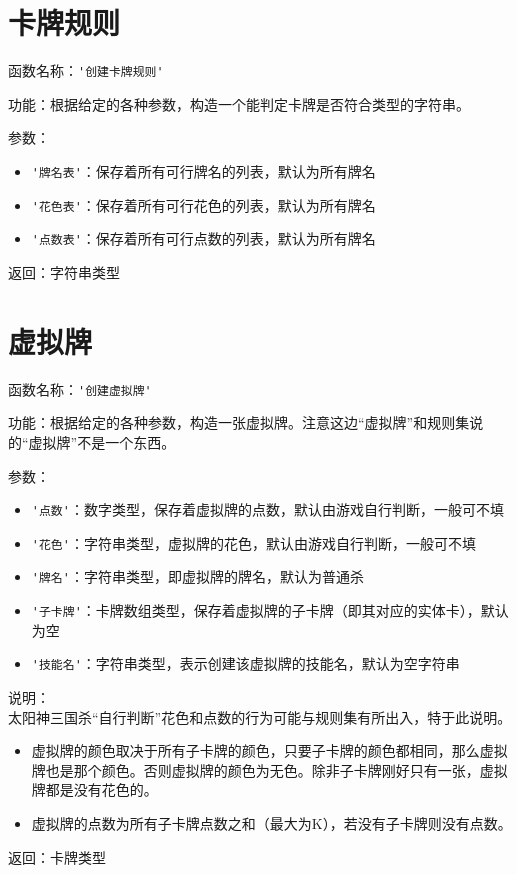 \section{卡牌规则}

函数名称：\verb|'创建卡牌规则'|

功能：根据给定的各种参数，构造一个能判定卡牌是否符合类型的字符串。

参数：

\begin{itemize}
  \item \verb|'牌名表'|：保存着所有可行牌名的列表，默认为所有牌名
  \item \verb|'花色表'|：保存着所有可行花色的列表，默认为所有牌名
  \item \verb|'点数表'|：保存着所有可行点数的列表，默认为所有牌名
\end{itemize}

返回：字符串类型

\section{虚拟牌}

函数名称：\verb|'创建虚拟牌'|

功能：根据给定的各种参数，构造一张虚拟牌。注意这边“虚拟牌”和规则集说的“虚拟牌”不是一个东西。

参数：

\begin{itemize}
  \item \verb|'点数'|：数字类型，保存着虚拟牌的点数，默认由游戏自行判断，一般可不填
  \item \verb|'花色'|：字符串类型，虚拟牌的花色，默认由游戏自行判断，一般可不填
  \item \verb|'牌名'|：字符串类型，即虚拟牌的牌名，默认为普通杀
  \item \verb|'子卡牌'|：卡牌数组类型，保存着虚拟牌的子卡牌（即其对应的实体卡），默认为空
  \item \verb|'技能名'|：字符串类型，表示创建该虚拟牌的技能名，默认为空字符串
\end{itemize}

说明：\\

太阳神三国杀“自行判断”花色和点数的行为可能与规则集有所出入，特于此说明。

\begin{itemize}
 \item 虚拟牌的颜色取决于所有子卡牌的颜色，只要子卡牌的颜色都相同，那么虚拟牌也是那个颜色。否则虚拟牌的颜色为无色。除非子卡牌刚好只有一张，虚拟牌都是没有花色的。
 \item 虚拟牌的点数为所有子卡牌点数之和（最大为K），若没有子卡牌则没有点数。
\end{itemize}

返回：卡牌类型
